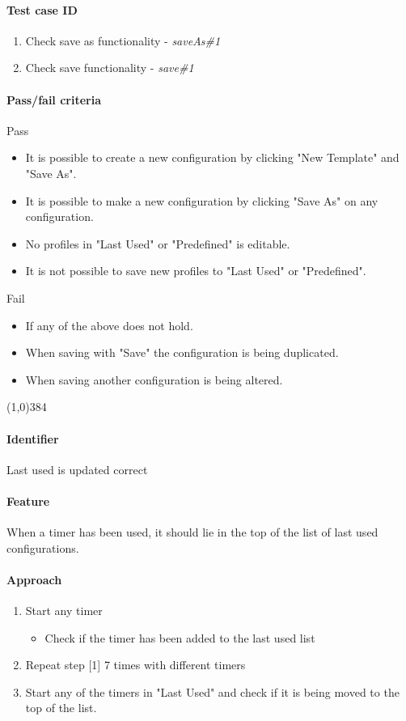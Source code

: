 \paragraph{Test case ID}
	\begin{enumerate}
		\item Check save as functionality - \textit{saveAs\#1}
		\item Check save functionality - \textit{save\#1}
	\end{enumerate}
\paragraph{Pass/fail criteria}
	Pass
	\begin{itemize}
		\item It is possible to create a new configuration by clicking "New Template" and "Save As".
		\item It is possible to make a new configuration by clicking "Save As" on any configuration.
		\item No profiles in "Last Used" or "Predefined" is editable.
		\item It is not possible to save new profiles to "Last Used" or "Predefined".
	\end{itemize}
	Fail
	\begin{itemize}
		\item If any of the above does not hold.
		\item When saving with "Save" the configuration is being duplicated.
		\item When saving another configuration is being altered.
	\end{itemize}


\begin{center}
	\line(1,0){384}
\end{center}
\paragraph{Identifier}
	Last used is updated correct
\paragraph{Feature}
	When a timer has been used, it should lie in the top of the list of last used configurations. 
\paragraph{Approach}
	\begin{enumerate} 
		\item Start any timer
			\begin{itemize}
				\item Check if the timer has been added to the last used list
			\end{itemize}
		\item Repeat step [1] 7 times with different timers
		\item Start any of the timers in "Last Used" and check if it is being moved to the top of the list.
	\end{enumerate}
